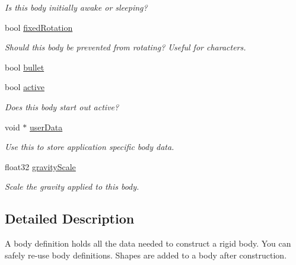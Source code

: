 \begin{DoxyCompactItemize}
\begin{DoxyCompactList}\small\item\em Is this body initially awake or sleeping? \end{DoxyCompactList}\item 
bool \hyperlink{structb2_body_def_a273a51c57440a8884de5939d76b6e3ea}{fixed\+Rotation}\hypertarget{structb2_body_def_a273a51c57440a8884de5939d76b6e3ea}{}\label{structb2_body_def_a273a51c57440a8884de5939d76b6e3ea}

\begin{DoxyCompactList}\small\item\em Should this body be prevented from rotating? Useful for characters. \end{DoxyCompactList}\item 
bool \hyperlink{structb2_body_def_a7c0047c9a98a1d20614eeddcdbce7586}{bullet}
\item 
bool \hyperlink{structb2_body_def_adf6f3e9a9e124e080c68bc0edeb170df}{active}\hypertarget{structb2_body_def_adf6f3e9a9e124e080c68bc0edeb170df}{}\label{structb2_body_def_adf6f3e9a9e124e080c68bc0edeb170df}

\begin{DoxyCompactList}\small\item\em Does this body start out active? \end{DoxyCompactList}\item 
void $\ast$ \hyperlink{structb2_body_def_ae457dd1d39be09945eace6061121be29}{user\+Data}\hypertarget{structb2_body_def_ae457dd1d39be09945eace6061121be29}{}\label{structb2_body_def_ae457dd1d39be09945eace6061121be29}

\begin{DoxyCompactList}\small\item\em Use this to store application specific body data. \end{DoxyCompactList}\item 
float32 \hyperlink{structb2_body_def_aadea3fa173ed1014739ec8b023de4336}{gravity\+Scale}\hypertarget{structb2_body_def_aadea3fa173ed1014739ec8b023de4336}{}\label{structb2_body_def_aadea3fa173ed1014739ec8b023de4336}

\begin{DoxyCompactList}\small\item\em Scale the gravity applied to this body. \end{DoxyCompactList}\end{DoxyCompactItemize}


\subsection{Detailed Description}
A body definition holds all the data needed to construct a rigid body. You can safely re-\/use body definitions. Shapes are added to a body after construction. 

